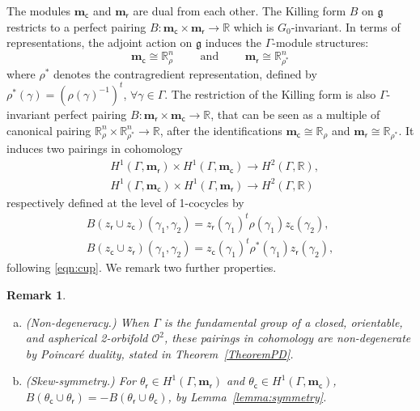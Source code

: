 \documentclass[a4paper,11pt]{article}
\newtheorem{Remark}[Theorem]{Remark}
\begin{document}
The modules $\mathbf m_{\mathsf c}$ and $\mathbf m_{\mathsf r}$ are dual
from each other. The Killing form $B$ 
on $\mathfrak g$ restricts to a perfect pairing
$B\colon \mathbf m_{\mathsf c}\times \mathbf m_{\mathsf r}\to\mathbb R$ which is $G_0$-invariant. In terms of representations, the adjoint action on
$\mathfrak g$ induces the $\Gamma$-module structures:
$$
\mathbf m_{\mathsf c}\cong \mathbb R^n_\rho \qquad \textrm{ and }
\qquad
\mathbf m_{\mathsf r}\cong \mathbb R^n_{\rho^*} 
$$
where $\rho^*$ denotes the contragredient representation,
defined by $\rho^*(\gamma)=(\rho(\gamma)^{-1})^t$,
$\forall\gamma\in\Gamma$. The restriction of the Killing form is also $\Gamma$-invariant perfect pairing 
$B\colon \mathbf m_{\mathsf r}\times \mathbf m_{\mathsf c}\to\mathbb R$,
that can be seen as a multiple of  canonical pairing  
$\mathbb R^n_\rho \times \mathbb R^n_{\rho^*} \to\mathbb R$,
after the identifications $\mathbf m_{\mathsf c}\cong \mathbb{R}_{\rho}$ and
 $\mathbf m_{\mathsf r}\cong \mathbb{R}_{\rho^*}$.
 It induces  two pairings in cohomology 
\begin{align*}
 &H^1(\Gamma, \mathbf m_{\mathsf r})\times
H^1(\Gamma, \mathbf m_{\mathsf c})\to H^2(\Gamma, \mathbb R),
\\
 &H^1(\Gamma, \mathbf m_{\mathsf c})\times
H^1(\Gamma, \mathbf m_{\mathsf r})\to H^2(\Gamma, \mathbb R)
\end{align*}
respectively
defined at the level of 1-cocycles by 
\begin{align*}
B(z_{\mathsf r}\cup z_{\mathsf c}) (\gamma_1,\gamma_2)=
z_{\mathsf r}(\gamma_1)^t \rho(\gamma_1)z_{\mathsf c}(\gamma_2),
\\
B(z_{\mathsf c}\cup z_{\mathsf r}) (\gamma_1,\gamma_2)=
z_{\mathsf c}(\gamma_1)^t \rho^*(\gamma_1)z_{\mathsf r}(\gamma_2),
\end{align*}
following \eqref{eqn:cup}. We remark two further properties.

\begin{Remark}
\label{Remark:PDSkS}
\begin{enumerate}[(a)]
 \item (Non-degeneracy.) When $\Gamma$ is the fundamental group of a closed,
orientable, and aspherical 2-orbifold $\mathcal O^2$, 
these pairings in cohomology are non-degenerate by Poincar\'e
duality, stated in Theorem~\ref{TheoremPD}.
 
 \item (Skew-symmetry.) For $\theta_{\mathsf r}\in H^1(\Gamma, \mathbf m_{\mathsf r})$
and $\theta_{\mathsf c}\in H^1(\Gamma, \mathbf m_{\mathsf c})$,
$
B(\theta_{\mathsf c}\cup \theta_{\mathsf r} )=
-B( \theta_{\mathsf r}\cup \theta_{\mathsf c} )
$, by Lemma~\ref{lemma:symmetry}.
\end{enumerate} 
\end{Remark}
\end{document}
